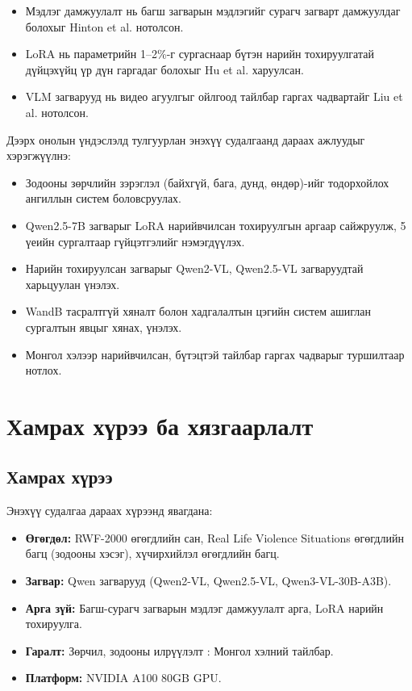 \begin{itemize}
    \item Мэдлэг дамжуулалт нь багш загварын мэдлэгийг сурагч загварт дамжуулдаг болохыг Hinton et al. \cite{hinton2015distilling} нотолсон.
    \item LoRA нь параметрийн 1--2\%-г сургаснаар бүтэн нарийн тохируулгатай дүйцэхүйц үр дүн гаргадаг болохыг Hu et al. \cite{hu2022lora} харуулсан.
    \item VLM загварууд нь видео агуулгыг ойлгоод тайлбар гаргах чадвартайг Liu et al. \cite{liu2023llava} нотолсон.
\end{itemize}

Дээрх онолын үндэслэлд тулгуурлан энэхүү судалгаанд дараах ажлуудыг хэрэгжүүлнэ:

\begin{itemize}
    \item Зодооны зөрчлийн зэрэглэл (байхгүй, бага, дунд, өндөр)-ийг тодорхойлох ангиллын систем боловсруулах.
    \item Qwen2.5-7B загварыг LoRA нарийвчилсан тохируулгын аргаар сайжруулж, 5 үеийн сургалтаар гүйцэтгэлийг нэмэгдүүлэх.
    \item Нарийн тохируулсан загварыг Qwen2-VL, Qwen2.5-VL загваруудтай харьцуулан үнэлэх.
    \item WandB тасралтгүй хяналт болон хадгалалтын цэгийн систем ашиглан сургалтын явцыг хянах, үнэлэх.
    \item Монгол хэлээр нарийвчилсан, бүтэцтэй тайлбар гаргах чадварыг туршилтаар нотлох.
\end{itemize}

\section{Хамрах хүрээ ба хязгаарлалт}

\subsection*{Хамрах хүрээ}

Энэхүү судалгаа дараах хүрээнд явагдана:

\begin{itemize}
    \item \textbf{Өгөгдөл:} RWF-2000 өгөгдлийн сан, Real Life Violence Situations өгөгдлийн багц (зодооны хэсэг), хүчирхийлэл өгөгдлийн багц.
    \item \textbf{Загвар:} Qwen загварууд (Qwen2-VL, Qwen2.5-VL, Qwen3-VL-30B-A3B).
    \item \textbf{Арга зүй:} Багш-сурагч загварын мэдлэг дамжуулалт арга, LoRA нарийн тохируулга.
    \item \textbf{Гаралт:} Зөрчил, зодооны илрүүлэлт : Монгол хэлний тайлбар.
    \item \textbf{Платформ:} NVIDIA A100 80GB GPU.
\end{itemize}

